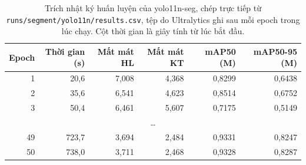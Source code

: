 \begin{table}[H]
\centering
\caption{Trích nhật ký huấn luyện của yolo11n-seg, chép trực tiếp từ \texttt{runs/segment/yolo11n/results.csv}, tệp do Ultralytics ghi sau mỗi epoch trong lúc chạy. Cột thời gian là giây tính từ lúc bắt đầu.}
\label{tab:log}
\small
\begin{tabular}{r r r r r r}
\toprule
Epoch & Thời gian (s) & Mất mát HL & Mất mát KT & mAP50 (M) & mAP50-95 (M) \\
\midrule
1 & 20{,}6 & 7{,}008 & 4{,}368 & 0{,}8299 & 0{,}6438 \\
2 & 35{,}6 & 6{,}541 & 4{,}623 & 0{,}8514 & 0{,}6752 \\
3 & 50{,}4 & 6{,}461 & 5{,}607 & 0{,}7175 & 0{,}5149 \\
\multicolumn{6}{c}{\dots} \\
49 & 723{,}7 & 3{,}694 & 2{,}484 & 0{,}9331 & 0{,}8247 \\
50 & 738{,}0 & 3{,}711 & 2{,}468 & 0{,}9328 & 0{,}8287 \\
\bottomrule
\end{tabular}
\end{table}
